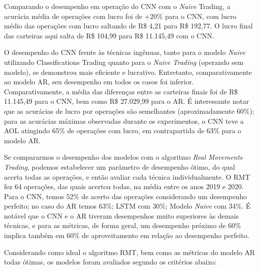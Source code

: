 \par
Comparando o desempenho em operação do CNN com o \textit{Naive} Trading, a acurácia média de operações com lucro foi de +20\% para o CNN, com lucro médio das operações com lucro saltando de R\$ 4,21 para R\$ 192,77. O lucro final das carteiras aqui salta de R\$ 104,99 para R\$ 11.145,49 com o CNN.

\par
O desempenho do CNN frente às técnicas ingênuas, tanto para o modelo \textit{Naive} utilizando Classifications Trading quanto para o \textit{Naive} \textit{Trading} (operando sem modelo), se demonstrou mais eficiente e lucrativo. Entretanto, comparativamente ao modelo AR, seu desempenho em todos os casos foi inferior. Comparativamente, a média das diferenças entre as carteiras finais foi de R\$ 11.145,49 para o CNN, bem como R\$ 27.029,99 para o AR. É interessante notar que as acurácias de lucro por operações são semelhantes (aproximadamente 60\%); para as acurácias máximas observadas durante os experimentos, o CNN teve a AOL atingindo 65\% de operações com lucro, em contrapartida de 63\% para o modelo AR.

\par
Se compararmos o desempenho dos modelos com o algoritmo \textit{Real Movements Trading}, podemos estabelecer um parâmetro de desempenho ótimo, do qual acerta todas as operações, e então avaliar cada técnica individualmente. O RMT fez 64 operações, das quais acertou todas, na média entre os anos 2019 e 2020. Para o CNN, temos 52\% de acerto das operações considerando um desempenho perfeito; no caso do AR temos 63\%; LSTM com 30\%; Modelo \textit{Naive} com 34\%. É notável que o CNN e o AR tiveram desempenhos muito superiores às demais técnicas, e para as métricas, de forma geral, um desempenho próximo de 60\% implica também em 60\% de aproveitamento em relação ao desempenho perfeito.


\par
Considerando como ideal o algoritmo RMT, bem como as métricas do modelo AR todas ótimas, os modelos foram avaliados segundo os critérios abaixo:


